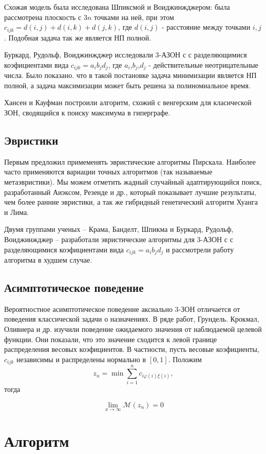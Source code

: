 \documentclass[14pt,a4paper]{article}
\begin{document}
Схожая модель была исследована Шпиксмой и
Воиджинжджером:
была рассмотрена плоскость с $3n$ точками на ней,
при этом $c_{ijk} = d(i,j) + d(i,k) + d(j,k)$, где
$d(i,j)$ - расстояние между точками $i,j$. Подобная
задача так же является НП полной.

Буркард, Рудольф, Воиджинжджер исследовали 3-АЗОН с
с разделяющимися коэфициентами вида $c_{ijk} = a_i b_j
d_j$,
где $a_i$,$ b_j $,$d_j$ - действительные неотрицательные
числа. Было показано. что в такой постановке задача
минимизации является НП полной, а задача максимизации
может быть решена за полиномиальное время.

Хансен и Кауфман построили алгоритм, схожий с венгерским
для класической ЗОН, сводящийся к поиску максимума в
гиперграфе.

\subsection{Эвристики}

Первым предложил примеменять эвристические алгоритмы
Пирскала. Наиболее часто применяются вариации точных
алгоритмов (так называемые метаэвристики). Мы можем
отметить жадный случайный адаптирующийся поиск,
разработанный
Аиэксом, Резенде и др., который показывает лучшие
результаты,
чем более ранние эвристики, а так же гибридный
генетический
алгоритм Хуанга и Лима.

Двумя группами ученых -- Крама, Банделт, Шпикма
и Буркард, Рудольф, Воиджинжджер -- разработали
эвристические
алгоритмы для 3-АЗОН с
с разделяющимися коэфициентами вида $c_{ijk} = a_i b_j
d_j$
и рассмотрели работу алгоритма в худшем случае.

\subsection{Асимптотическое поведение}

Вероятностное асимптотическое поведение аксиально 3-ЗОН
отличается от поведения классической задачи о назначениях.
В ряде работ, Грундель. Крокмал, Оливиера и др. изучили
поведение ожидаемого значения от наблюдаемой целевой функции.
Они показали, что это значение сходится к левой границе распределения 
весовых коэфициентов. В частности, пусть весовые коэфициенты, $c_{ijk}$ 
независимы и распределены нормально в $ \left[ 0 , 1 \right] $. 
Положим 
$$
 	z_{n} = \min \sum^n_{i=1} c_{i \varphi (i) \xi (i)}, 
$$
тогда 

$$
	\lim_{x\to\infty} \mathcal{M} (z_n) = 0
$$

\section{Алгоритм}
\end{document}
